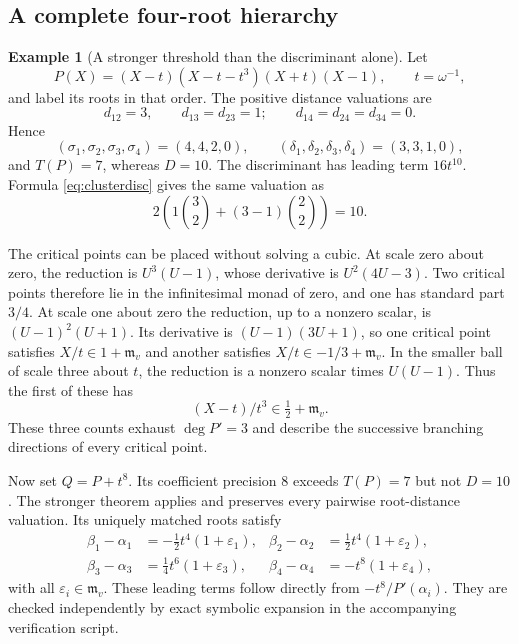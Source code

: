 \documentclass[11pt,letterpaper]{article}
\numberwithin{equation}{section}
\theoremstyle{definition}
\newtheorem{example}[example]{Example}
\theoremstyle{remark}
\newcommand{\mv}{\mathfrak m_v}
\begin{document}
\subsection{A complete four-root hierarchy}\label{subsec:quartic}
\begin{example}[A stronger threshold than the discriminant alone]\label{ex:quartic}
Let
\begin{equation}\label{eq:quartic}
 P(X)=(X-t)(X-t-t^3)(X+t)(X-1),\qquad t=\omega^{-1},
\end{equation}
and label its roots in that order. The positive distance valuations are
\[
 d_{12}=3,\qquad d_{13}=d_{23}=1;
 \qquad d_{14}=d_{24}=d_{34}=0.
\]
Hence
\begin{equation}\label{eq:quarticdata}
 (\sigma_1,\sigma_2,\sigma_3,\sigma_4)=(4,4,2,0),\qquad
 (\delta_1,\delta_2,\delta_3,\delta_4)=(3,3,1,0),
\end{equation}
and $T(P)=7$, whereas $D=10$. The discriminant has leading term
$16t^{10}$. Formula \eqref{eq:clusterdisc} gives the same valuation as
\[
 2\left(1\binom32+(3-1)\binom22\right)=10.
\]

The critical points can be placed without solving a cubic. At scale zero
about zero, the reduction is $U^3(U-1)$, whose derivative is
$U^2(4U-3)$. Two critical points therefore lie in the infinitesimal monad
of zero, and one has standard part $3/4$. At scale one about zero the
reduction, up to a nonzero scalar, is $(U-1)^2(U+1)$. Its derivative is
$(U-1)(3U+1)$, so one critical point satisfies $X/t\in1+\mv$ and another
satisfies $X/t\in-1/3+\mv$. In the smaller ball of scale three about $t$,
the reduction is a nonzero scalar times $U(U-1)$. Thus the first of these
has
\[
 (X-t)/t^3\in\tfrac12+\mv.
\]
These three counts exhaust $\deg P'=3$ and describe the successive
branching directions of every critical point.

Now set $Q=P+t^8$. Its coefficient precision $8$ exceeds $T(P)=7$ but
not $D=10$. The stronger theorem applies and preserves every pairwise
root-distance valuation. Its uniquely matched roots satisfy
\begin{align}
 \beta_1-\alpha_1&=-\tfrac12t^4(1+\varepsilon_1),&
 \beta_2-\alpha_2&= \tfrac12t^4(1+\varepsilon_2),\\
 \beta_3-\alpha_3&= \tfrac14t^6(1+\varepsilon_3),&
 \beta_4-\alpha_4&=-t^8(1+\varepsilon_4),
\end{align}
with all $\varepsilon_i\in\mv$. These leading terms follow directly from
$-t^8/P'(\alpha_i)$. They are checked independently by exact symbolic
expansion in the accompanying verification script.
\end{example}
\end{document}
